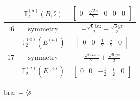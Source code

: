 \documentclass[fleqn,8pt,landscape]{jsarticle}
\begin{document}
\begin{longtable}{ccc}
$  $ & $ \mathbb{T}_{2}^{(a)}(B,2) $ & $ \begin{bmatrix} 0 & \frac{\sqrt{2} i}{2} & 0 & 0 & 0 \end{bmatrix} $ \\ \hline
$ 16 $ & $ \text{symmetry} $ & $ - \frac{\sqrt{6} i x z}{2} + \frac{\sqrt{6} y z}{2} $ \\
$  $ & $ \mathbb{T}_{2}^{(a)}(E^{(a)}) $ & $ \begin{bmatrix} 0 & 0 & \frac{1}{2} & \frac{i}{2} & 0 \end{bmatrix} $ \\ \hline
$ 17 $ & $ \text{symmetry} $ & $ \frac{\sqrt{6} i x z}{2} + \frac{\sqrt{6} y z}{2} $ \\
$  $ & $ \mathbb{T}_{2}^{(a)}(E^{(b)}) $ & $ \begin{bmatrix} 0 & 0 & - \frac{1}{2} & \frac{i}{2} & 0 \end{bmatrix} $ \\ \hline
\end{longtable}
bra: $=\bra{s}$
\end{document}
